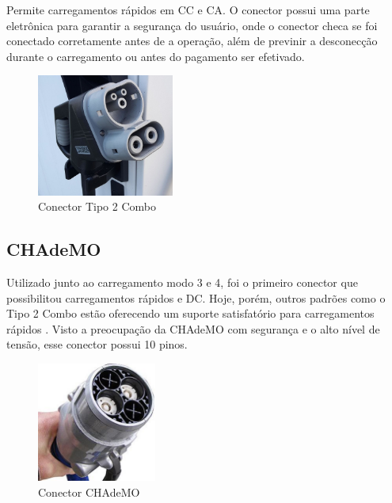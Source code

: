         Permite carregamentos rápidos em \ac{CC} e \ac{CA}. O conector possui uma parte eletrônica para garantir a segurança do usuário, onde o conector checa se foi conectado corretamente antes de a operação, além de previnir a desconecção durante o carregamento ou antes do pagamento ser efetivado.

        \begin{figure}[H]
          \begin{center}
            \includegraphics[width=0.40\textwidth,natwidth=1024,natheight=973]{assets/images/connectors-combo.jpg}
            \caption{Conector Tipo 2 Combo}
            \label{fig:combo}
          \end{center}
        \end{figure}

      \subsection{CHAdeMO}

        Utilizado junto ao carregamento modo 3 e 4, foi o primeiro conector que possibilitou carregamentos rápidos e DC. Hoje, porém, outros padrões como o Tipo 2 Combo estão oferecendo um suporte satisfatório para carregamentos rápidos \cite{ieee-review-evse}. Visto a preocupação da CHAdeMO com segurança e o alto nível de tensão, esse conector possui 10 pinos.

        \begin{figure}[H]
          \begin{center}
            \includegraphics[width=0.35\textwidth,natwidth=300,natheight=300]{assets/images/connectors-chademo.jpg}
            \caption{Conector CHAdeMO}
            \label{fig:chademo}
          \end{center}
        \end{figure}

